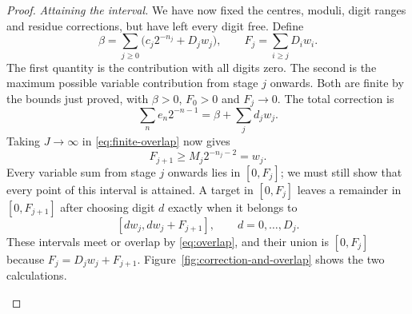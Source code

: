 \documentclass[11pt]{article}
\begin{document}
\begin{proof}
\par\medskip\noindent\emph{Attaining the interval.}
We have now fixed the centres, moduli, digit ranges and residue
corrections, but have left every digit free.  Define
\[
 \beta=\sum_{j\ge0}\bigl(c_j2^{-n_j}+D_jw_j\bigr),\qquad
 F_j=\sum_{i\ge j}D_iw_i.
\]
The first quantity is the contribution with all digits zero.  The
second is the maximum possible variable contribution from stage $j$
onwards.  Both are finite by the bounds just proved, with $\beta>0$,
$F_0>0$ and $F_j\to0$.  The total correction is
\[
 \sum_ne_n2^{-n-1}=\beta+\sum_jd_jw_j.
\]
Taking $J\to\infty$ in \eqref{eq:finite-overlap} now gives
\begin{equation}\label{eq:overlap}
 F_{j+1}\ge M_j2^{-n_j-2}=w_j.
\end{equation}
Every variable sum from stage $j$ onwards lies in $[0,F_j]$; we must
still show that every point of this interval is attained.  A target in
$[0,F_j]$ leaves a remainder in $[0,F_{j+1}]$ after choosing digit $d$
exactly when it belongs to
\[
 [dw_j,dw_j+F_{j+1}],\qquad d=0,\ldots,D_j.
\]
These intervals meet or overlap by \eqref{eq:overlap}, and their union
is $[0,F_j]$ because $F_j=D_jw_j+F_{j+1}$.  Figure~\ref{fig:correction-and-overlap}
shows the two calculations.
\begin{figure}[t]
\centering
{}
\end{figure}
\end{proof}
\end{document}
